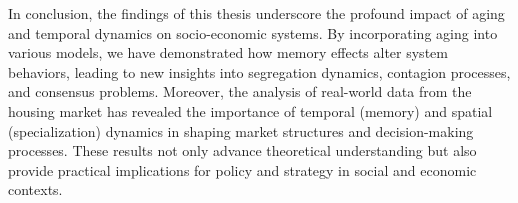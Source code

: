 In conclusion, the findings of this thesis underscore the profound impact of aging and temporal dynamics on socio-economic systems. By incorporating aging into various models, we have demonstrated how memory effects alter system behaviors, leading to new insights into segregation dynamics, contagion processes, and consensus problems. Moreover, the analysis of real-world data from the housing market has revealed the importance of temporal (memory) and spatial (specialization) dynamics in shaping market structures and decision-making processes. These results not only advance theoretical understanding but also provide practical implications for policy and strategy in social and economic contexts.
